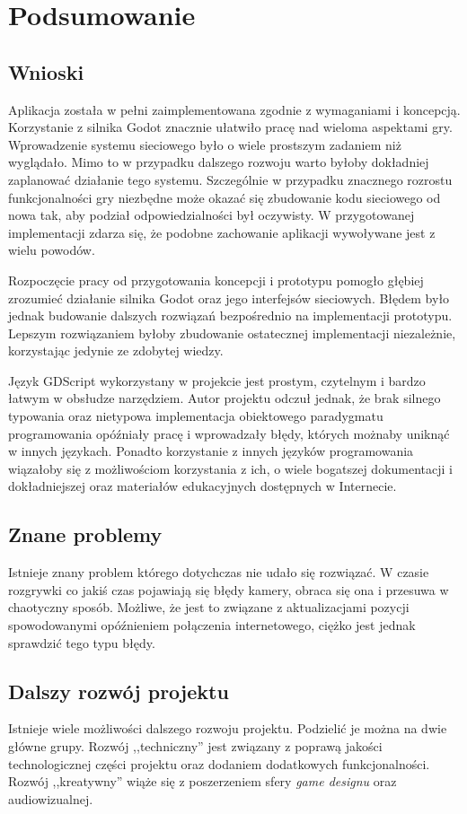 \chapter{Podsumowanie}

\section{Wnioski}
Aplikacja została w pełni zaimplementowana zgodnie z wymaganiami i koncepcją. Korzystanie z silnika Godot znacznie ułatwiło pracę nad wieloma aspektami gry. Wprowadzenie systemu sieciowego było o wiele prostszym zadaniem niż wyglądało. Mimo to w przypadku dalszego rozwoju warto byłoby dokładniej zaplanować działanie tego systemu. Szczególnie w przypadku znacznego rozrostu funkcjonalności gry niezbędne może okazać się zbudowanie kodu sieciowego od nowa tak, aby podział odpowiedzialności był oczywisty. W przygotowanej implementacji zdarza się, że podobne zachowanie aplikacji wywoływane jest z wielu powodów. 

Rozpoczęcie pracy od przygotowania koncepcji i prototypu pomogło głębiej zrozumieć działanie silnika Godot oraz jego interfejsów sieciowych. Błędem było jednak budowanie dalszych rozwiązań bezpośrednio na implementacji prototypu. Lepszym rozwiązaniem byłoby zbudowanie ostatecznej implementacji niezależnie, korzystając jedynie ze zdobytej wiedzy.

Język GDScript wykorzystany w projekcie jest prostym, czytelnym i bardzo łatwym w obsłudze narzędziem. Autor projektu odczuł jednak, że brak silnego typowania oraz nietypowa implementacja obiektowego paradygmatu programowania opóźniały pracę i wprowadzały błędy, których możnaby uniknąć w innych językach. Ponadto korzystanie z innych języków programowania wiązałoby się z możliwościom korzystania z ich, o wiele bogatszej dokumentacji i dokładniejszej oraz materiałów edukacyjnych dostępnych w Internecie.

\section{Znane problemy}
Istnieje znany problem którego dotychczas nie udało się rozwiązać. W czasie rozgrywki co jakiś czas pojawiają się błędy kamery, obraca się ona i przesuwa w chaotyczny sposób. Możliwe, że jest to związane z aktualizacjami pozycji spowodowanymi opóźnieniem połączenia internetowego, ciężko jest jednak sprawdzić tego typu błędy. 

\section{Dalszy rozwój projektu}
Istnieje wiele możliwości dalszego rozwoju projektu. Podzielić je można na dwie główne grupy. Rozwój ,,techniczny'' jest związany z poprawą jakości technologicznej części projektu oraz dodaniem dodatkowych funkcjonalności. Rozwój ,,kreatywny'' wiąże się z poszerzeniem sfery \emph{game designu} oraz audiowizualnej.

